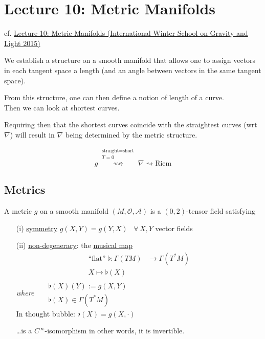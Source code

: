 \section{Lecture 10: Metric Manifolds}

cf. \href{https://youtu.be/ONCZNwKswn4}{Lecture 10: Metric Manifolds (International Winter School on Gravity and Light 2015)}

We establish a structure on a smooth manifold that allows one to assign vectors in each tangent space a length (and an angle between vectors in the same tangent space).

From this structure, one can then define a notion of length of a curve. \\
Then we can look at shortest curves.

Requiring then that the shortest curves coincide with the straightest curves (wrt $\nabla$) will result in $\nabla$ being determined by the metric structure.  

\[
g  \overset{ \substack{ \text{straight} = \text{short} \\ T =0 }  }{ \rightsquigarrow }  \nabla \rightsquigarrow \text{Riem}
\]


\subsection{Metrics}

\begin{definition}
  A metric $g$ on a smooth manifold $(M,\mathcal{O}, \mathcal{A})$ is a $(0,2)$-tensor field satisfying
\begin{enumerate}
  \item[(i)] \underline{symmetry} $g(X,Y) = g(Y,X)$ \, $\forall \, X, Y$ vector fields
\item[(ii)] \underline{non-degeneracy}: the \underline{musical map} 
\[
\begin{aligned}
  \text{``flat''} \, \,  \flat : \Gamma(TM) & \to \Gamma(T^*M) \\ 
  X \mapsto \flat(X)
\end{aligned}
\]
\emph{where} \quad \,  $\begin{aligned} & \quad \quad \\ 
  & \flat(X)(Y):= g(X,Y) \\
  & \flat(X) \in \Gamma(T^*M) \end{aligned}$ \\
In thought bubble: $\flat(X) = g(X,\cdot)$

\dots is a $C^{\infty}$-isomorphism in other words, it is invertible.  


\end{enumerate}
\end{definition}


